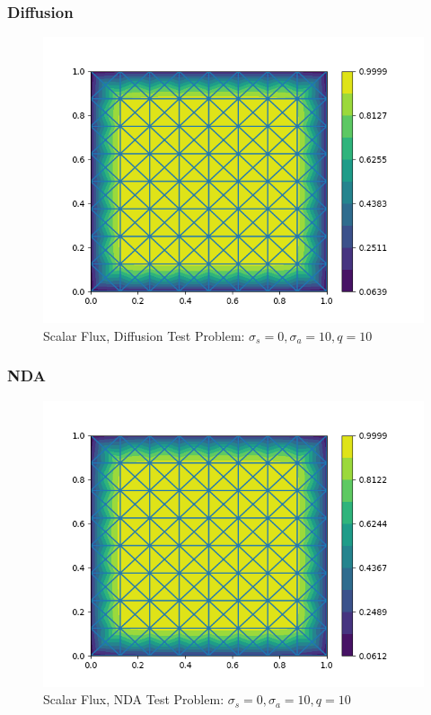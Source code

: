 \subsubsection{Diffusion}
\begin{figure}[H]
    \centering
    \includegraphics[width=\textwidth]{fig/diff_noscat.png}
    \caption{Scalar Flux, Diffusion Test Problem: $\sigma_s = 0, \sigma_a=10, q=10$}
    \label{fig:diff_noscatter}
\end{figure}
\subsubsection{NDA}
\begin{figure}[H]
    \centering
    \includegraphics[width=\textwidth]{fig/nda_noscat.png}
    \caption{Scalar Flux, NDA Test Problem: $\sigma_s = 0, \sigma_a=10, q=10$}
    \label{fig:nda_noscatter}
\end{figure}
